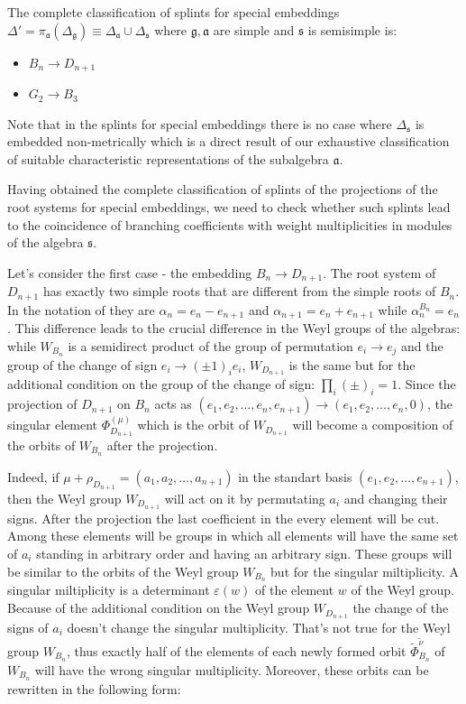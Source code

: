 \documentclass[12pt]{iopart}
\newcommand{\pia}{\pi_{\mathfrak{a}}}
\newcommand{\gf}{\mathfrak{g}}
\newcommand{\af}{\mathfrak{a}}
\newcommand{\sfr}{\mathfrak{s}}
\begin{document}
The complete classification of splints for special embeddings $\Delta'=\pia(\Delta_{\gf})
\equiv \Delta_{\af}\cup \Delta_{\sfr}$ where $\gf, \af$ are simple and $\sfr$ is semisimple is:
\begin{itemize}
\item $B_{n}\to D_{n+1}$
\item $G_{2}\to B_{3}$
\end{itemize}

Note that in the splints for special embeddings there is no case where $\Delta_{\sfr}$ is embedded
non-metrically which is a direct result of our exhaustive classification of suitable characteristic
representations of the subalgebra $\af$.


Having obtained the complete classification of splints of the projections of
the root systems for special embeddings, we need to check whether such splints lead
to the coincidence of branching coefficients with weight multiplicities in modules of
the algebra $\sfr$.

Let's consider the first case - the embedding $B_{n}\to D_{n+1}$. The root system of $D_{n+1}$ has
exactly two simple roots that are different from the simple roots of $B_{n}$. In the notation of
\cite{bourbaki2002lie} they are $\alpha_{n}=e_n-e_{n+1}$ and $\alpha_{n+1}=e_n+e_{n+1}$ while
$\alpha_n^{B_n}=e_n$. This difference leads to the crucial difference in the Weyl groups of the
algebras: while $W_{B_{n}}$ is a semidirect product of the group of permutation $e_{i} \to e_{j}$
and the group of the change of sign $e_{i}\to (\pm 1)_{i}e_{i}$, $W_{D_{n+1}}$ is the same but for
the additional condition on the group of the change of sign: $\prod_{i} (\pm)_{i}=1.$ Since the
projection of $D_{n+1}$ on $B_{n}$ acts as
$(e_1,e_2,\dots,e_{n},e_{n+1})\to(e_1,e_2,\dots,e_{n},0)$, the singular element
$\Phi^{(\mu)}_{D_{n+1}}$ which is the orbit of $W_{D_{n+1}}$ will become a composition of the orbits
of $W_{B_{n}}$ after the projection.

Indeed, if $\mu+\rho_{D_{n+1}}=(a_1,a_2,\dots,a_{n+1})$ in the standart basis
$(e_1,e_2,\dots,e_{n+1})$, then the Weyl group $W_{D_{n+1}}$ will act on it by permutating $a_i$ and
changing their signs. After the projection the last coefficient in the every element will be cut. Among
these elements will be groups in which all elements will have the same set of $a_i$ standing in
arbitrary order and having an arbitrary sign. These groups will be similar to the orbits of the Weyl
group $W_{B_{n}}$ but for the singular miltiplicity. A singular miltiplicity is a determinant
$\varepsilon (w)$ of the element $w$ of the Weyl group. Because of the additional condition on the
Weyl group $W_{D_{n+1}}$ the change of the signs of $a_i$ doesn't change the singular multiplicity.
That's not true for the Weyl group $W_{B_{n}}$, thus exactly half of the elements of each newly
formed orbit $\tilde\Phi^{\tilde\nu}_{B_n}$ of $W_{B_{n}}$ will have the wrong singular
multiplicity. Moreover, these orbits can be rewritten in the following form:
\end{document}
